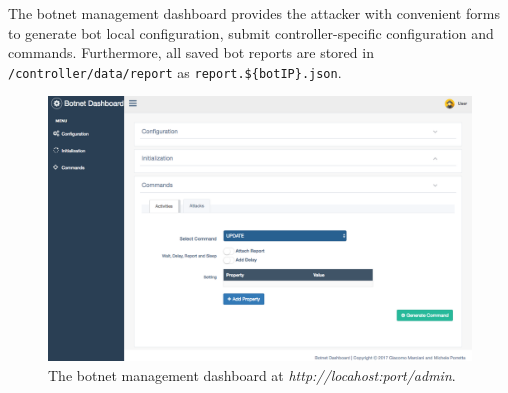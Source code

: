 The botnet management dashboard provides the attacker with convenient forms to generate bot local configuration, submit controller-specific configuration and commands. 
Furthermore, all saved bot reports are stored in \texttt{/controller/data/report} as \texttt{report.\$\{botIP\}.json}.

\begin{figure}[tp]
  \centering
  \includegraphics[scale=0.32]{./fig/dashboard.png}
  \caption{The botnet management dashboard at \textit{http://locahost:port/admin}.}
    \label{fig:controller-botnet-dashboard}
\end{figure}


